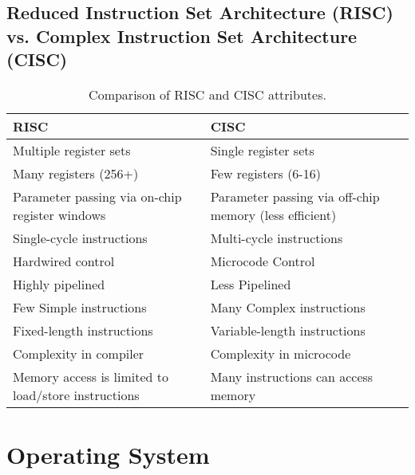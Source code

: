 \documentclass[pdftex,10pt]{article}
\begin{document}
\subsection{Reduced Instruction Set Architecture (RISC) vs. Complex Instruction Set Architecture (CISC)}
\begin{table}[H]
    \centering
    \begin{tabularx}{\textwidth}{| X | X |}
        \hline
        \textbf{RISC}                                       & \textbf{CISC}                                          \\ \hline
        Multiple register sets                              & Single register sets                                   \\ \hline
        Many registers (256+)                               & Few registers (6-16)                                   \\ \hline
        Parameter passing via on-chip register windows      & Parameter passing via off-chip memory (less efficient) \\ \hline
        Single-cycle instructions                           & Multi-cycle instructions                               \\ \hline
        Hardwired control                                   & Microcode Control                                      \\ \hline
        Highly pipelined                                    & Less Pipelined                                         \\ \hline
        Few Simple instructions                             & Many Complex instructions                              \\ \hline
        Fixed-length instructions                           & Variable-length instructions                           \\ \hline
        Complexity in compiler                              & Complexity in microcode                                \\ \hline
        Memory access is limited to load/store instructions & Many instructions can access memory                    \\ \hline
    \end{tabularx}
    \caption{Comparison of RISC and CISC attributes.}
\end{table}

\section{Operating System}
\end{document}
